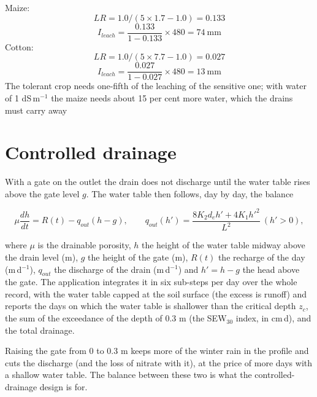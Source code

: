 \sol {}\ans Maize: \[LR=1.0/(5\times1.7-1.0)=0.133\] \ans \[I_{leach}=\frac{0.133}{1-0.133}\times480=74\ \text{mm}\] \ans Cotton: \[LR=1.0/(5\times7.7-1.0)=0.027\] \ans \[I_{leach}=\frac{0.027}{1-0.027}\times480=13\ \text{mm}\] \ans The tolerant crop needs one-fifth of the leaching of the sensitive one; with water of 1 dS\,m$^{-1}$ the maize needs about 15 per cent more water, which the drains must carry away \finans

\section{Controlled drainage}
With a gate on the outlet the drain does not discharge until the water table rises above the gate level $g$. The water table then follows, day by day, the balance

\begin{equation}\boxed{\mu\frac{dh}{dt}=R(t)-q_{out}(h-g),\qquad q_{out}(h')=\frac{8K_2d_eh'+4K_1h'^2}{L^2}\ (h'>0),}\label{eq:dr-ctl}\end{equation}
\par\noindent where $\mu$ is the drainable porosity, $h$ the height of the water table midway above the drain level (m), $g$ the height of the gate (m), $R(t)$ the recharge of the day (m\,d$^{-1}$), $q_{out}$ the discharge of the drain (m\,d$^{-1}$) and $h'=h-g$ the head above the gate. The application integrates it in six sub-steps per day over the whole record, with the water table capped at the soil surface (the excess is runoff) and reports the days on which the water table is shallower than the critical depth $z_c$, the sum of the exceedance of the depth of 0.3 m (the SEW$_{30}$ index, in cm\,d), and the total drainage.



Raising the gate from 0 to 0.3 m keeps more of the winter rain in the profile and cuts the discharge (and the loss of nitrate with it), at the price of more days with a shallow water table. The balance between these two is what the controlled-drainage design is for.

